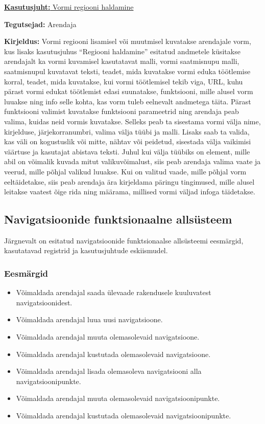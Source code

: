 \documentclass[a4paper,12pt]{article} %
\begin{document}
\underline{\textbf{Kasutusjuht:} Vormi regiooni haldamine}
\par
\textbf{Tegutsejad:} Arendaja
\par
\textbf{Kirjeldus:} Vormi regiooni lisamisel või muutmisel kuvatakse arendajale vorm, kus lisaks kasutusjuhus ``Regiooni haldamine'' esitatud andmetele küsitakse arendajalt ka vormi kuvamisel kasutatavat malli, vormi saatmisnupu malli, saatmisnupul kuvatavat teksti, teadet, mida kuvatakse vormi eduka töötlemise korral, teadet, mida kuvatakse, kui vormi töötlemisel tekib viga, URL, kuhu pärast vormi edukat töötlemist edasi suunatakse, funktsiooni, mille alusel vorm luuakse ning info selle kohta, kas vorm tuleb eelnevalt andmetega täita. Pärast funktsiooni valimist kuvatakse funktsiooni parameetrid ning arendaja peab valima, kuidas neid vormis kuvatakse. Selleks peab ta sisestama vormi välja nime, kirjelduse, järjekorranumbri, valima välja tüübi ja malli. Lisaks saab ta valida, kas väli on kogustuslik või mitte, nähtav või peidetud, sisestada välja vaikimisi väärtuse ja kasutajat abistava teksti. Juhul kui välja tüübiks on element, mille abil on võimalik kuvada mitut valikuvõimalust, siis peab arendaja valima vaate ja veerud, mille põhjal valikud luuakse. Kui on valitud vaade, mille põhjal vorm eeltäidetakse, siis peab arendaja ära kirjeldama päringu tingimused, mille alusel leitakse vaatest õige rida ning määrama, millised vormi väljad infoga täidetakse.

\subsection{Navigatsioonide funktsionaalne allsüsteem}
Järgnevalt on esitatud navigatsioonide funktsionaalse allsüsteemi eesmärgid, kasutatavad registrid ja kasutusjuhtude eskiismudel.
\subsubsection{Eesmärgid}
\begin{itemize}
\item Võimaldada arendajal saada ülevaade rakendusele kuuluvatest navigatsioonidest.
\item Võimaldada arendajal luua uusi navigatsioone.
\item Võimaldada arendajal muuta olemasolevaid navigatsioone.
\item Võimaldada arendajal kustutada olemasolevaid navigatsioone.
\item Võimaldada arendajal lisada olemasoleva navigatsiooni alla navigatsioonipunkte.
\item Võimaldada arendajal muuta olemasolevaid navigatsioonipunkte.
\item Võimaldada arendajal kustutada olemasolevaid navigatsioonipunkte.
\end{itemize}
\end{document}

